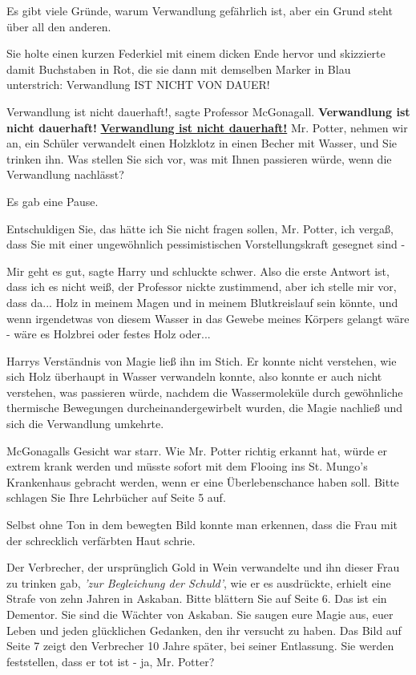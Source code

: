 \glqq Es gibt viele Gründe, warum Verwandlung gefährlich ist, aber ein Grund
steht über all den anderen.\grqq{}

Sie holte einen kurzen Federkiel mit einem dicken Ende hervor und skizzierte
damit Buchstaben in Rot, die sie dann mit demselben Marker in Blau unterstrich:
Verwandlung IST NICHT VON DAUER!

\glqq Verwandlung ist nicht dauerhaft!\grqq{}, sagte Professor McGonagall.
\glqq \textbf{Verwandlung ist nicht dauerhaft!} \textbf{\underline{Verwandlung
ist nicht dauerhaft!}} Mr. Potter, nehmen wir an, ein Schüler verwandelt einen
Holzklotz in einen Becher mit Wasser, und Sie trinken ihn. Was stellen Sie sich
vor, was mit Ihnen passieren würde, wenn die Verwandlung nachlässt?\grqq{}

Es gab eine Pause.

\glqq Entschuldigen Sie, das hätte ich Sie nicht fragen sollen, Mr. Potter, ich
vergaß, dass Sie mit einer ungewöhnlich pessimistischen Vorstellungskraft
gesegnet sind -\grqq{}

\glqq Mir geht es gut\grqq{}, sagte Harry und schluckte schwer. \glqq Also die
erste Antwort ist, dass ich es nicht weiß\grqq{}, der Professor nickte
zustimmend, \glqq aber ich stelle mir vor, dass da... Holz in meinem Magen und
in meinem Blutkreislauf sein könnte, und wenn irgendetwas von diesem Wasser in
das Gewebe meines Körpers gelangt wäre - wäre es Holzbrei oder festes Holz
oder...\grqq{}

Harrys Verständnis von Magie ließ ihn im Stich. Er konnte nicht verstehen, wie
sich Holz überhaupt in Wasser verwandeln konnte, also konnte er auch nicht
verstehen, was passieren würde, nachdem die Wassermoleküle durch gewöhnliche
thermische Bewegungen durcheinandergewirbelt wurden, die Magie nachließ und sich
die Verwandlung umkehrte.

McGonagalls Gesicht war starr. \glqq Wie Mr. Potter richtig erkannt hat, würde
er extrem krank werden und müsste sofort mit dem Flooing ins St. Mungo's
Krankenhaus gebracht werden, wenn er eine Überlebenschance haben soll. Bitte
schlagen Sie Ihre Lehrbücher auf Seite 5 auf.\grqq{}

Selbst ohne Ton in dem bewegten Bild konnte man erkennen, dass die Frau mit der
schrecklich verfärbten Haut schrie.

\glqq Der Verbrecher, der ursprünglich Gold in Wein verwandelte und ihn dieser
Frau zu trinken gab, \emph{'zur Begleichung der Schuld'}, wie er es ausdrückte,
erhielt eine Strafe von zehn Jahren in Askaban. Bitte blättern Sie auf Seite 6.
Das ist ein Dementor. Sie sind die Wächter von Askaban. Sie saugen eure Magie
aus, euer Leben und jeden glücklichen Gedanken, den ihr versucht zu haben. Das
Bild auf Seite 7 zeigt den Verbrecher 10 Jahre später, bei seiner Entlassung.
Sie werden feststellen, dass er tot ist - ja, Mr. Potter?\grqq{}

